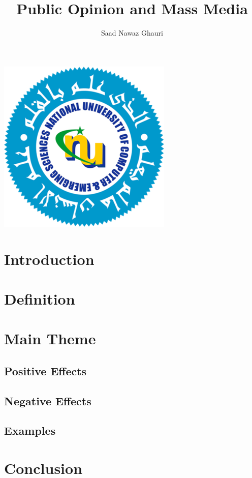\documentclass[a4paper,11pt]{article}
\author{Saad Nawaz Ghauri}
\title{Public Opinion and Mass Media}
\begin{document}
\maketitle

\begin{Center}
\includegraphics{nuces_logo.png}
\end{Center}

\tableofcontents


\section{Introduction}

\section{Definition}

\section{Main Theme}
\subsection{Positive Effects}
\subsection{Negative Effects}
\subsection{Examples}

\section{Conclusion}
\end{document}
